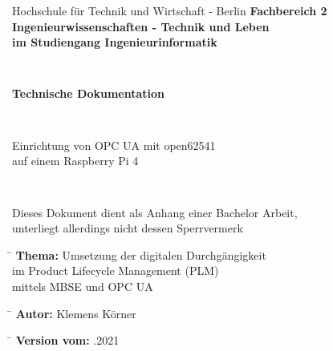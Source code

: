 \documentclass[a4paper,12pt]{article}
\begin{document}
\thispagestyle{empty}

\begin{verbatim}
\end{verbatim}
\begin{center}
	\doublespacing
	\LARGE{Hochschule für Technik und Wirtschaft - Berlin}
	\singlespacing
	\textbf{\Large{Fachbereich 2\\  Ingenieurwissenschaften - Technik und Leben \\im Studiengang Ingenieurinformatik}}
\end{center}
\begin{verbatim}
	
\end{verbatim}
\begin{center}
	\doublespacing
	\textbf{\Large{Technische Dokumentation}}\\
	\singlespacing
\end{center}
\begin{verbatim}
	
\end{verbatim}
\begin{center}
	\Large{Einrichtung von OPC UA mit open62541} 	\\
	\Large{auf einem Raspberry Pi 4}\\
\end{center}
\begin{verbatim}
	
\end{verbatim}
\begin{center}
	Dieses Dokument dient als Anhang einer Bachelor Arbeit, \\ unterliegt allerdings nicht dessen Sperrvermerk
\end{center} 
\begin{tabbing}
	\hspace{5cm}\=\kill
	\textbf{Thema:}	\> Umsetzung der digitalen Durchgängigkeit \\ \> im Product   Lifecycle Management   (PLM) \\ \> mittels MBSE und OPC UA
\end{tabbing} 
\begin{tabbing}
	\hspace{5cm}\=\kill
	\textbf{Autor:}	\> Klemens Körner
\end{tabbing} 
\begin{tabbing}
	\hspace{5cm}\=\kill
	\textbf{Version vom:}	.2021
\end{tabbing} 
\clearpage
\end{document}
